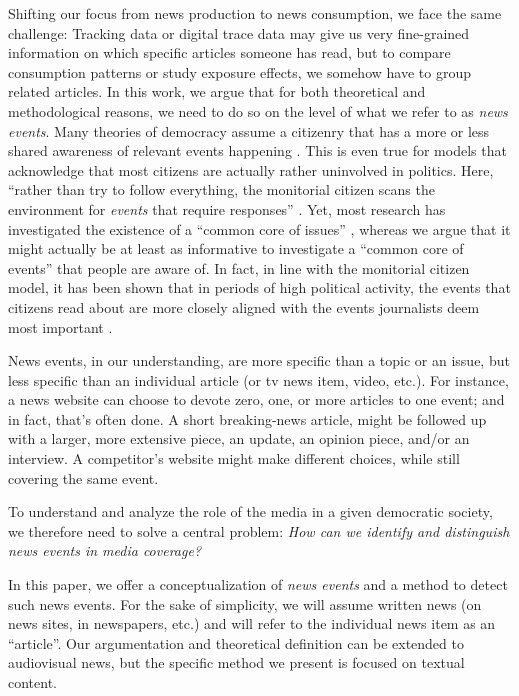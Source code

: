 \documentclass[a4paper,man,natbib,floatsintext,mask]{apa6}
\begin{document}
Shifting our focus from news production to news consumption, we face the same challenge:
Tracking data or digital trace data may give us very fine-grained information on which specific articles someone has read, but to compare consumption patterns or study exposure effects, we somehow have to group related articles.
In this work, we argue that for both theoretical and methodological reasons, we need to do so on the level of what we refer to as \emph{news events}.
Many theories of democracy assume a citizenry that has a more or less shared awareness of relevant events happening \citep{Ferree2002,Stromback2005}.
 This is even true for models that acknowledge that most citizens are actually rather uninvolved in politics. Here, ``rather than  try  to  follow  everything,  the  monitorial  citizen  scans  the  environment  for  \emph{events}  that  require  responses'' \citep[p.~118; emphasis ours]{Zaller2003}. Yet, most research has investigated the existence of a ``common core of issues''  \citep[e.g.,][]{Chaffee2001,Geiss2018b,Moeller2016}, whereas we argue that it might actually be at least as informative to investigate a ``common core of events'' that people are aware of. In fact, in line with the monitorial citizen model, it has been shown that in periods of high political activity, the events that citizens read about are more closely aligned with the events journalists deem most important \citep{boczkowski2013}. 

News events, in our understanding, are more specific than a topic or an issue, but less specific than an individual article (or tv news item, video, etc.). For instance, a news website can choose to devote zero, one, or more articles to one event; and in fact, that's often done. A short breaking-news article, might be followed up with a larger, more extensive piece, an update, an opinion piece, and/or an interview. A competitor's website might make different choices, while still covering the same event.

To understand and analyze the role of the media in a given democratic society, we therefore need to solve a central problem: \emph{How can we identify and distinguish news events in media coverage?}

In this paper, we offer a conceptualization of \emph{news events} and a method to detect such news events. For the sake of simplicity, we will assume written news (on news sites, in newspapers, etc.) and will refer to the individual news item as an ``article''. Our argumentation and theoretical definition can be extended to audiovisual news, but the specific method we present is focused on textual content.
\end{document}

